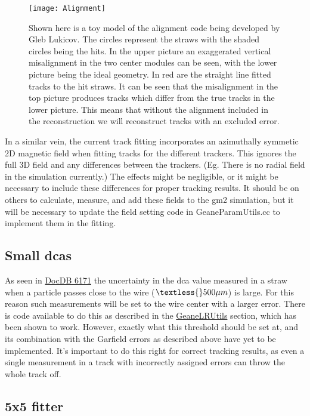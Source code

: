 			\begin{figure}[]
				\caption{Shown here is a toy model of the alignment code being developed by Gleb Lukicov. The circles represent the straws with the shaded circles being the hits. In the upper picture an exaggerated vertical misalignment in the two center modules can be seen, with the lower picture being the ideal geometry. In red are the straight line fitted tracks to the hit straws. It can be seen that the misalignment in the top picture produces tracks which differ from the true tracks in the lower picture. This means that without the alignment included in the reconstruction we will reconstruct tracks with an excluded error.}
				\centering
				\texttt{[image: Alignment]}
				\label{fig:Alignment}
			\end{figure}

		In a similar vein, the current track fitting incorporates an azimuthally symmetic 2D magnetic field when fitting tracks for the different trackers. This ignores the full 3D field and any differences between the trackers. (Eg. There is no radial field in the simulation currently.) The effects might be negligible, or it might be necessary to include these differences for proper tracking results. It should be on others to calculate, measure, and add these fields to the gm2 simulation, but it will be necessary to update the field setting code in GeaneParamUtils.cc to implement them in the fitting.

	\subsection{Small dcas}

		As seen in \href{https://gm2-docdb.fnal.gov/cgi-bin/private/ShowDocument?docid=6171}{DocDB 6171} the uncertainty in the dca value measured in a straw when a particle passes close to the wire ($\textless{}500 \mu m$) is large. For this reason such measurements will be set to the wire center with a larger error. There is code available to do this as described in the \hyperref[sec:GeaneLRUtils]{GeaneLRUtils} section, which has been shown to work. However, exactly what this threshold should be set at, and its combination with the Garfield errors as described above have yet to be implemented. It's important to do this right for correct tracking results, as even a single measurement in a track with incorrectly assigned errors can throw the whole track off.

	\subsection{5x5 fitter}

